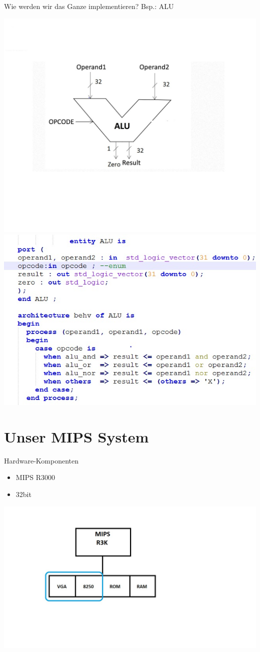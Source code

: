 \begin{frame}{Wie werden wir das Ganze implementieren? Bsp.: ALU}

\begin{center}

\includegraphics[keepaspectratio=true,width=.4\linewidth]{Alu.jpeg}
\includegraphics[keepaspectratio=true,width=.7\linewidth]{Alu-code.jpeg}
\end{center}
\end{frame}
\section{Unser MIPS System}

\begin{frame}{Hardware-Komponenten}

\begin{itemize}
	\item MIPS R3000
	\item 32bit
\end{itemize}

\begin{center}
\includegraphics[scale=0.40]{bus.jpeg} %
\end{center}

\end{frame}

